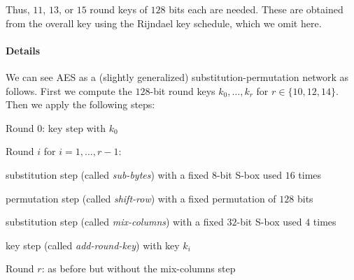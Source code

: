 Thus, $11$, $13$, or $15$ round keys of $128$ bits each are needed.
These are obtained from the overall key using the Rijndael key schedule, which we omit here.

\paragraph{Details}
We can see AES as a (slightly generalized) substitution-permutation network as follows.
First we compute the $128$-bit round keys $k_0,\ldots,k_r$ for $r\in\{10,12,14\}$.
Then we apply the following steps:
\begin{compactenum}
 \item Round 0: key step with $k_0$
 \item Round $i$ for $i=1,\ldots,r-1$:
  \begin{compactenum}
    \item substitution step (called \emph{sub-bytes}) with a fixed $8$-bit S-box used $16$ times
    \item permutation step (called \emph{shift-row}) with a fixed permutation of $128$ bits
    \item substitution step (called \emph{mix-columns}) with a fixed $32$-bit S-box used $4$ times
    \item key step (called \emph{add-round-key}) with key $k_i$
  \end{compactenum}
 \item Round $r$: as before but without the mix-columns step
\end{compactenum}

